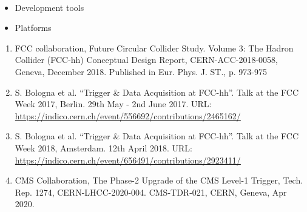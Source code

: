 



~\\




\begin{itemize}
\item \textcolor{emphasis}{Development tools} 
\end{itemize}
\divider

\begin{itemize}
\item \textcolor{emphasis}{Platforms}
\end{itemize}






\begin{enumerate}
  \item \small{FCC collaboration, Future Circular Collider Study. Volume 3: The Hadron Collider (FCC-hh) Conceptual Design Report, CERN-ACC-2018-0058, Geneva, December 2018. Published in Eur. Phys. J. ST., p. 973-975}
  \item \small{S. Bologna et al. “Trigger \& Data Acquisition at FCC-hh”. Talk at the FCC Week 2017, Berlin. 29th May - 2nd June 2017. 
URL: \url{https://indico.cern.ch/event/556692/contributions/2465162/}}
  \item \small{S. Bologna et al. “Trigger \& Data Acquisition at FCC-hh”. Talk at the FCC Week 2018, Amsterdam. 12th April 2018. 
URL: \url{https://indico.cern.ch/event/656491/contributions/2923411/}}
\item \small{CMS Collaboration, The Phase-2 Upgrade of the CMS Level-1 Trigger, Tech. Rep. 1274, CERN-LHCC-2020-004. CMS-TDR-021, CERN, Geneva, Apr 2020.}
\end{enumerate}


